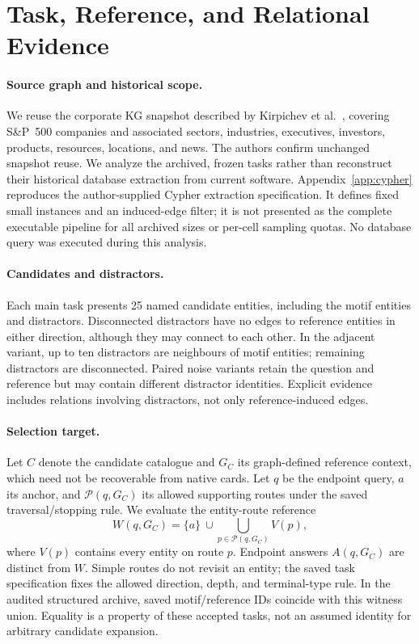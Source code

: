 \section{Task, Reference, and Relational Evidence}
\label{sec:method}
\paragraph{Source graph and historical scope.}
We reuse the corporate KG snapshot described by Kirpichev et al.~\cite{kirpichev2026towards}, covering S\&P~500 companies and associated sectors, industries, executives, investors, products, resources, locations, and news. The authors confirm unchanged snapshot reuse. We analyze the archived, frozen tasks rather than reconstruct their historical database extraction from current software. Appendix~\ref{app:cypher} reproduces the author-supplied Cypher extraction specification. It defines fixed small instances and an induced-edge filter; it is not presented as the complete executable pipeline for all archived sizes or per-cell sampling quotas. No database query was executed during this analysis.



\paragraph{Candidates and distractors.}
Each main task presents 25 named candidate entities, including the motif entities and distractors. Disconnected distractors have no edges to reference entities in either direction, although they may connect to each other. In the adjacent variant, up to ten distractors are neighbours of motif entities; remaining distractors are disconnected. Paired noise variants retain the question and reference but may contain different distractor identities. Explicit evidence includes relations involving distractors, not only reference-induced edges.

\paragraph{Selection target.}
Let $C$ denote the candidate catalogue and $G_C$ its graph-defined reference context, which need not be recoverable from native cards. Let $q$ be the endpoint query, $a$ its anchor, and $\mathcal{P}(q,G_C)$ its allowed supporting routes under the saved traversal/stopping rule. We evaluate the entity-route reference
\begin{equation}
 W(q,G_C)=\{a\}\ \cup\!\bigcup_{p\in\mathcal{P}(q,G_C)} V(p),
\end{equation}
where $V(p)$ contains every entity on route $p$. Endpoint answers $A(q,G_C)$ are distinct from $W$. Simple routes do not revisit an entity; the saved task specification fixes the allowed direction, depth, and terminal-type rule. In the audited structured archive, saved motif/reference IDs coincide with this witness union. Equality is a property of these accepted tasks, not an assumed identity for arbitrary candidate expansion.

